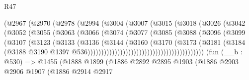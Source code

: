 \begin{lexlean}{R47}
\begin{coremodule}
                            (@2967
                              (@2970
                                (@2978
                                  (@2994
                                    (@3004
                                      (@3007
                                        (@3015
                                          (@3018
                                            (@3026
                                              (@3042
                                                (@3052
                                                  (@3055
                                                    (@3063
                                                      (@3066
                                                        (@3074
                                                          (@3077
                                                            (@3085
                                                              (@3088
                                                                (@3096
                                                                  (@3099
                                                                    (@3107
                                                                      (@3123
                                                                        (@3133
                                                                          (@3136
                                                                            (@3144
                                                                              (@3160
                                                                                (@3170
                                                                                  (@3173
                                                                                    (@3181
                                                                                      (@3184
                                                                                        (@3188
                                                                                          @3190
                                                                                          @1397
                                                                                          @536)))))))))))))))))))))))))))))))))))))))))))
    (fun (__b : @530) =>
    @1455
      (@1888
        @1899
        (@1886
          @2892
          @2895
          @1903
          (@1886
            @2903
            @2906
            @1907
            (@1886
              @2914
              @2917

\end{coremodule}
\end{lexlean}
